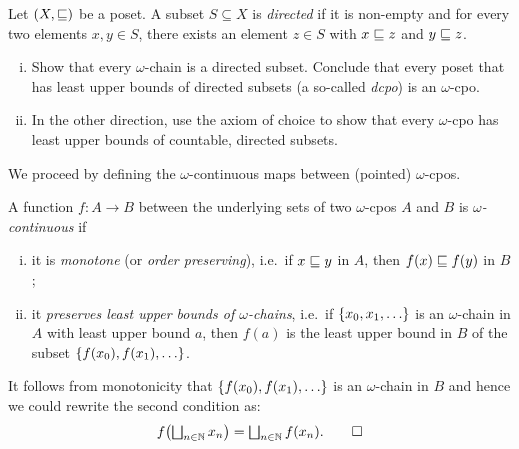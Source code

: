 \begin{exercise}\label{exer:directedness}
  Let \((X,{\sqsubseteq})\) be a poset. A subset \(S \subseteq X\) is \emph{directed}
  if it is non-empty and for every two elements \(x,y \in S\), there exists an
  element \(z \in S\) with \(x \sqsubseteq z\) and \(y \sqsubseteq z\).
  \begin{enumerate}[(i)]
  \item Show that every \(\omega\)-chain is a directed subset.
    Conclude that every poset that has least upper bounds of directed subsets (a
    so-called \emph{dcpo}) is an \(\omega\)-cpo.
  \item In the other direction, use the axiom of choice to show that every
    \(\omega\)-cpo has least upper bounds of countable, directed
    subsets.\qedhere
  \end{enumerate}
\end{exercise}

We proceed by defining the \(\omega\)-continuous maps between (pointed)
\(\omega\)-cpos.
\begin{definition}\label{def:continuity}
  A function \(f \colon A \to B\) between the underlying sets of two
  \(\omega\)-cpos \(A\) and \(B\) is \emph{\(\omega\)-continuous} if
  \begin{enumerate}[(i)]
  \item\label{monotone} it is \emph{monotone} (or \emph{order preserving}),
    i.e.\ if \(x \sqsubseteq y\) in \(A\), then \(f(x) \sqsubseteq f(y)\) in \(B\);
  \item\label{preserve-lub-of-omega-chains} it \emph{preserves least upper
      bounds of \(\omega\)-chains}, i.e.\ if \(\set{x_0,x_1,\dots}\) is an
    \(\omega\)-chain in \(A\) with least upper bound \(a\), then \(f(a)\) is the
    least upper bound in \(B\) of the subset \(\set{f(x_0),f(x_1),\dots}\). \qedhere
  \end{enumerate}
\end{definition}

\begin{remark}
  It follows from monotonicity that \(\set{f(x_0),f(x_1),\dots}\) is an
  \(\omega\)-chain in \(B\) and hence we could rewrite the second condition as:
  \[
    f\pa*{\textstyle\bigsqcup_{n \in \Nat}x_n} = \textstyle\bigsqcup_{n \in
      \Nat}f(x_n). \qedhere
  \]
\end{remark}

